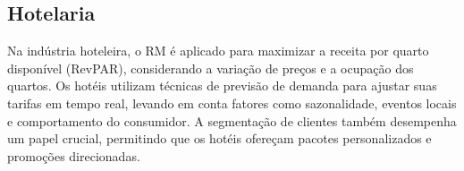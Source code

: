 


\subsection{Hotelaria}
Na indústria hoteleira, o RM é aplicado para maximizar a receita por quarto disponível (RevPAR), considerando a variação de preços e a ocupação dos quartos. Os hotéis utilizam técnicas de previsão de demanda para ajustar suas tarifas em tempo real, levando em conta fatores como sazonalidade, eventos locais e comportamento do consumidor. A segmentação de clientes também desempenha um papel crucial, permitindo que os hotéis ofereçam pacotes personalizados e promoções direcionadas.


